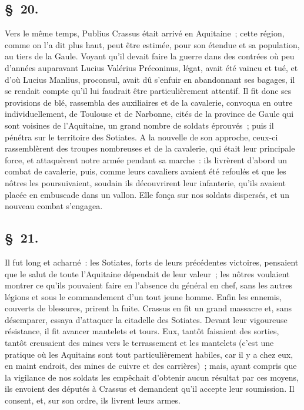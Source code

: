 \documentclass[french,twoside]{book} %
\begin{document}
\subsection[{§ 20.}]{ \textsc{§ 20.} }
\noindent Vers le même temps, Publius Crassus était arrivé en Aquitaine ; cette région, comme on l’a dit plus haut, peut être estimée, pour son étendue et sa population, au tiers de la Gaule. Voyant qu’il devait faire la guerre dans des contrées où peu d’années auparavant Lucius Valérius Préconinus, légat, avait été vaincu et tué, et d’où Lucius Manlius, proconsul, avait dû s’enfuir en abandonnant ses bagages, il se rendait compte qu’il lui faudrait être particulièrement attentif. Il fit donc ses provisions de blé, rassembla des auxiliaires et de la cavalerie, convoqua en outre individuellement, de Toulouse et de Narbonne, cités de la province de Gaule qui sont voisines de l’Aquitaine, un grand nombre de soldats éprouvés ; puis il pénétra sur le territoire des Sotiates. A la nouvelle de son approche, ceux-ci rassemblèrent des troupes nombreuses et de la cavalerie, qui était leur principale force, et attaquèrent notre armée pendant sa marche : ils livrèrent d’abord un combat de cavalerie, puis, comme leurs cavaliers avaient été refoulés et que les nôtres les poursuivaient, soudain ils découvrirent leur infanterie, qu’ils avaient placée en embuscade dans un vallon. Elle fonça sur nos soldats dispersés, et un nouveau combat s’engagea.
\subsection[{§ 21.}]{ \textsc{§ 21.} }
\noindent Il fut long et acharné : les Sotiates, forts de leurs précédentes victoires, pensaient que le salut de toute l’Aquitaine dépendait de leur valeur ; les nôtres voulaient montrer ce qu’ils pouvaient faire en l’absence du général en chef, sans les autres légions et sous le commandement d’un tout jeune homme. Enfin les ennemis, couverts de blessures, prirent la fuite. Crassus en fit un grand massacre et, sans désemparer, essaya d’attaquer la citadelle des Sotiates. Devant leur vigoureuse résistance, il fit avancer mantelets et tours. Eux, tantôt faisaient des sorties, tantôt creusaient des mines vers le terrassement et les mantelets (c’est une pratique où les Aquitains sont tout particulièrement habiles, car il y a chez eux, en maint endroit, des mines de cuivre et des carrières) ; mais, ayant compris que la vigilance de nos soldats les empêchait d’obtenir aucun résultat par ces moyens, ils envoient des députés à Crassus et demandent qu’il accepte leur soumission. Il consent, et, sur son ordre, ils livrent leurs armes.
\end{document}
